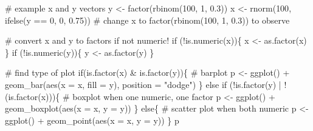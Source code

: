 \documentclass[
  letterpaper,
]{latex/krantz}
\makeatletter
\newenvironment{Shaded}{\begin{snugshade}}{\end{snugshade}}
\newcommand{\AttributeTok}[1]{\textcolor[rgb]{0.40,0.45,0.13}{#1}}
\newcommand{\CommentTok}[1]{\textcolor[rgb]{0.37,0.37,0.37}{#1}}
\newcommand{\ControlFlowTok}[1]{\textcolor[rgb]{0.00,0.23,0.31}{#1}}
\newcommand{\DecValTok}[1]{\textcolor[rgb]{0.68,0.00,0.00}{#1}}
\newcommand{\FloatTok}[1]{\textcolor[rgb]{0.68,0.00,0.00}{#1}}
\newcommand{\FunctionTok}[1]{\textcolor[rgb]{0.28,0.35,0.67}{#1}}
\newcommand{\NormalTok}[1]{\textcolor[rgb]{0.00,0.23,0.31}{#1}}
\newcommand{\OtherTok}[1]{\textcolor[rgb]{0.00,0.23,0.31}{#1}}
\newcommand{\SpecialCharTok}[1]{\textcolor[rgb]{0.37,0.37,0.37}{#1}}
\newcommand{\StringTok}[1]{\textcolor[rgb]{0.13,0.47,0.30}{#1}}
\newenvironment{kframe}{%
\medskip{}
\setlength{\fboxsep}{.8em}
 \def\at@end@of@kframe{}%
 \ifinner\ifhmode%
  \def\at@end@of@kframe{\end{minipage}}%
  \begin{minipage}{\columnwidth}%
 \fi\fi%
 \def\FrameCommand##1{\hskip\@totalleftmargin \hskip-\fboxsep
 \colorbox{shadecolor}{##1}\hskip-\fboxsep
     \hskip-\linewidth \hskip-\@totalleftmargin \hskip\columnwidth}%
 \MakeFramed {\advance\hsize-\width
   \@totalleftmargin\z@ \linewidth\hsize
   \@setminipage}}%
 {\par\unskip\endMakeFramed%
 \at@end@of@kframe}
\renewenvironment{Shaded}{\begin{kframe}}{\end{kframe}}
\makeatother
\begin{document}
\begin{Shaded}
\begin{Highlighting}[]
\CommentTok{\# example x and y vectors}
\NormalTok{y }\OtherTok{\textless{}{-}} \FunctionTok{factor}\NormalTok{(}\FunctionTok{rbinom}\NormalTok{(}\DecValTok{100}\NormalTok{, }\DecValTok{1}\NormalTok{, }\FloatTok{0.3}\NormalTok{))}
\NormalTok{x }\OtherTok{\textless{}{-}} \FunctionTok{rnorm}\NormalTok{(}\DecValTok{100}\NormalTok{, }\FunctionTok{ifelse}\NormalTok{(y }\SpecialCharTok{==} \DecValTok{0}\NormalTok{, }\DecValTok{0}\NormalTok{, }\FloatTok{0.75}\NormalTok{)) }
\CommentTok{\# change x to factor(rbinom(100, 1, 0.3)) to observe}

\CommentTok{\# convert x and y to factors if not numeric!}
\ControlFlowTok{if}\NormalTok{ (}\SpecialCharTok{!}\FunctionTok{is.numeric}\NormalTok{(x))\{ x }\OtherTok{\textless{}{-}} \FunctionTok{as.factor}\NormalTok{(x) \}}
\ControlFlowTok{if}\NormalTok{ (}\SpecialCharTok{!}\FunctionTok{is.numeric}\NormalTok{(y))\{ y }\OtherTok{\textless{}{-}} \FunctionTok{as.factor}\NormalTok{(y) \}}

\CommentTok{\# find type of plot}
\ControlFlowTok{if}\NormalTok{(}\FunctionTok{is.factor}\NormalTok{(x) }\SpecialCharTok{\&} \FunctionTok{is.factor}\NormalTok{(y))\{}
  \CommentTok{\# barplot }
\NormalTok{  p }\OtherTok{\textless{}{-}} \FunctionTok{ggplot}\NormalTok{() }\SpecialCharTok{+} \FunctionTok{geom\_bar}\NormalTok{(}\FunctionTok{aes}\NormalTok{(}\AttributeTok{x =}\NormalTok{ x, }\AttributeTok{fill =}\NormalTok{ y), }\AttributeTok{position =} \StringTok{"dodge"}\NormalTok{)}
\NormalTok{\} }\ControlFlowTok{else} \ControlFlowTok{if}\NormalTok{ (}\SpecialCharTok{!}\FunctionTok{is.factor}\NormalTok{(y) }\SpecialCharTok{|} \SpecialCharTok{!}\NormalTok{(}\FunctionTok{is.factor}\NormalTok{(x)))\{}
  \CommentTok{\# boxplot when one numeric, one factor}
\NormalTok{  p }\OtherTok{\textless{}{-}} \FunctionTok{ggplot}\NormalTok{() }\SpecialCharTok{+} \FunctionTok{geom\_boxplot}\NormalTok{(}\FunctionTok{aes}\NormalTok{(}\AttributeTok{x =}\NormalTok{ x, }\AttributeTok{y =}\NormalTok{ y))}
\NormalTok{\} }\ControlFlowTok{else}\NormalTok{\{}
  \CommentTok{\# scatter plot when both numeric}
\NormalTok{  p }\OtherTok{\textless{}{-}} \FunctionTok{ggplot}\NormalTok{() }\SpecialCharTok{+} \FunctionTok{geom\_point}\NormalTok{(}\FunctionTok{aes}\NormalTok{(}\AttributeTok{x =}\NormalTok{ x, }\AttributeTok{y =}\NormalTok{ y))}
\NormalTok{\}}
\NormalTok{p}
\end{Highlighting}
\end{Shaded}
\end{document}
